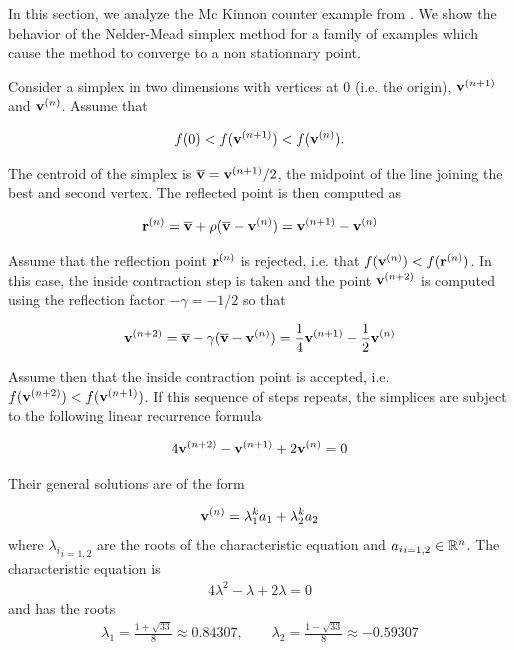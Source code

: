 In this section, we analyze the Mc Kinnon counter example 
from \cite{589109}. We show the behavior of the 
Nelder-Mead simplex method for a family of examples which cause the 
method to converge to a non stationnary point.

Consider a simplex in two dimensions with vertices at 0 (i.e. the origin),
$\mathbf{v}^{(n+1)}$ and $\mathbf{v}^{(n)}$. Assume that 

\begin{eqnarray}
\label{mckinnon-sortedfv}
f(0) < f(\mathbf{v}^{(n+1)}) < f(\mathbf{v}^{(n)}).
\end{eqnarray}

The centroid of the simplex is $\overline{\mathbf{v}} = \mathbf{v}^{(n+1)}/2$, the midpoint
of the line joining the best and second vertex. The reflected 
point is then computed as 

\begin{eqnarray}
\label{mckinnon-reflection}
\mathbf{r}^{(n)} = \overline{\mathbf{v}} + \rho ( \overline{\mathbf{v}} - \mathbf{v}^{(n)} ) 
= \mathbf{v}^{(n+1)} - \mathbf{v}^{(n)}
\end{eqnarray}

Assume that the reflection point $\mathbf{r}^{(n)}$ is rejected, i.e. that 
$f(\mathbf{v}^{(n)}) < f(\mathbf{r}^{(n)})$. In this case, the inside contraction 
step is taken and the point $\mathbf{v}^{(n+2)}$ is computed using the 
reflection factor $-\gamma = -1/2$ so that 

\begin{eqnarray}
\label{mckinnon-insidecontraction}
\mathbf{v}^{(n+2)} = \overline{\mathbf{v}} - 
\gamma ( \overline{\mathbf{v}} - \mathbf{v}^{(n)} ) 
= \frac{1}{4} \mathbf{v}^{(n+1)} - \frac{1}{2} \mathbf{v}^{(n)}
\end{eqnarray}

Assume then that the inside contraction point is accepted, i.e. $f(\mathbf{v}^{(n+2)}) < f(\mathbf{v}^{(n+1)})$.
If this sequence of steps repeats, the simplices are subject to the 
following linear recurrence formula

\begin{eqnarray}
\label{mckinnon-reccurence}
4 \mathbf{v}^{(n+2)} - \mathbf{v}^{(n+1)} + 2 \mathbf{v}^{(n)} = 0
\end{eqnarray}

Their general solutions are of the form 

\begin{eqnarray}
\mathbf{v}^{(n)} = \lambda_1^k a_1 + \lambda_2^k a_2
\end{eqnarray}
where ${\lambda_i}_{i=1,2}$ are the roots of the characteristic equation and 
${a_i}_{i=1,2} \in \mathbb{R}^n$. 
The characteristic equation is 
\begin{eqnarray}
\label{mckinnon-caracequation}
4 \lambda^2 - \lambda + 2 \lambda = 0
\end{eqnarray}
and has the roots 
\begin{eqnarray}
\label{mckinnon-roots}
\lambda_1 = \frac{1 + \sqrt{33}}{8}\approx 0.84307, 
\qquad \lambda_2 = \frac{1 - \sqrt{33}}{8} \approx -0.59307
\end{eqnarray}

